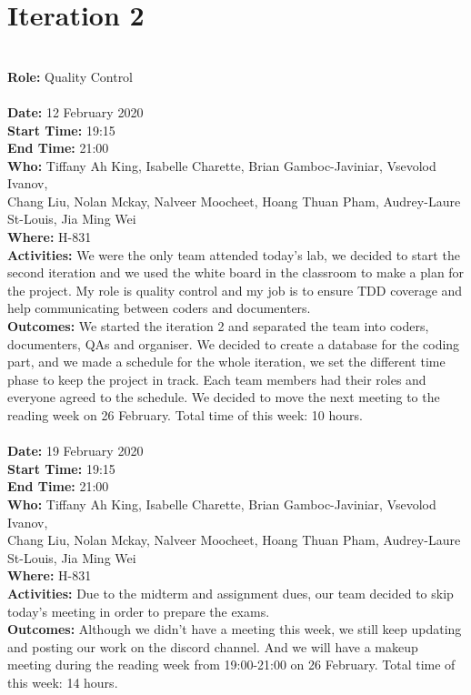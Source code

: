 \documentclass[12pt]{article}
\begin{document}
\section{Iteration 2}\\
{\bf Role:} Quality Control\\\\
{\bf Date:} 12 February 2020\\
{\bf Start Time:} 19:15\\
{\bf End Time:} 21:00\\
{\bf Who:} Tiffany Ah King, Isabelle Charette, Brian Gamboc-Javiniar, Vsevolod Ivanov,\\
Chang Liu, Nolan Mckay, Nalveer Moocheet, Hoang Thuan Pham, Audrey-Laure St-Louis, Jia Ming Wei\\
{\bf Where:} H-831\\
{\bf Activities:} We were the only team attended today's lab, we decided to start the second iteration and we used the white board in the classroom to make a plan for the project. My role is quality control and my job is to ensure TDD coverage and help communicating between coders and documenters.\\
{\bf Outcomes:} We started the iteration 2 and separated the team into coders, documenters, QAs and organiser. We decided to create a database for the coding part, and we made a schedule for the whole iteration, we set the different time phase to keep the project in track. Each team members had their roles and everyone agreed to the schedule. We decided to move the next meeting to the reading week on 26 February. Total time of this week: 10 hours.\\\\
{\bf Date:} 19 February 2020\\
{\bf Start Time:} 19:15\\
{\bf End Time:} 21:00\\
{\bf Who:} Tiffany Ah King, Isabelle Charette, Brian Gamboc-Javiniar, Vsevolod Ivanov,\\
Chang Liu, Nolan Mckay, Nalveer Moocheet, Hoang Thuan Pham, Audrey-Laure St-Louis, Jia Ming Wei\\
{\bf Where:} H-831\\
{\bf Activities:} Due to the midterm and assignment dues, our team decided to skip today's meeting in order to prepare the exams.\\
{\bf Outcomes:} Although we didn't have a meeting this week, we still keep updating and posting our work on the discord channel. And we will have a makeup meeting during the reading week from 19:00-21:00 on 26 February. Total time of this week: 14 hours.\\\\
\end{document}
